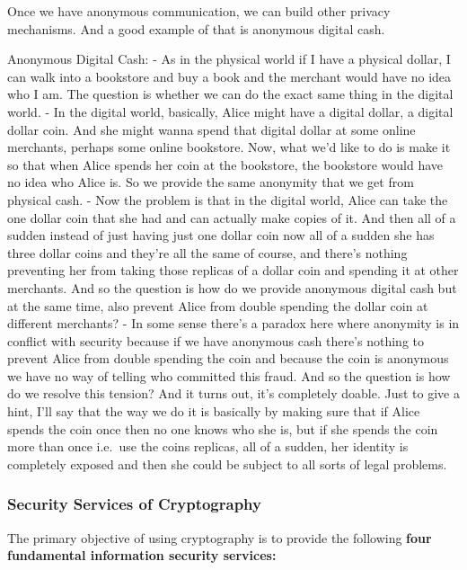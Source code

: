 \documentclass[11pt]{article}
\begin{document}
Once we have anonymous communication, we can build other privacy
mechanisms. And a good example of that is anonymous digital cash.

Anonymous Digital Cash: - As in the physical world if I have a physical
dollar, I can walk into a bookstore and buy a book and the merchant
would have no idea who I am. The question is whether we can do the exact
same thing in the digital world. - In the digital world, basically,
Alice might have a digital dollar, a digital dollar coin. And she might
wanna spend that digital dollar at some online merchants, perhaps some
online bookstore. Now, what we'd like to do is make it so that when
Alice spends her coin at the bookstore, the bookstore would have no idea
who Alice is. So we provide the same anonymity that we get from physical
cash. - Now the problem is that in the digital world, Alice can take the
one dollar coin that she had and can actually make copies of it. And
then all of a sudden instead of just having just one dollar coin now all
of a sudden she has three dollar coins and they're all the same of
course, and there's nothing preventing her from taking those replicas of
a dollar coin and spending it at other merchants. And so the question is
how do we provide anonymous digital cash but at the same time, also
prevent Alice from double spending the dollar coin at different
merchants? - In some sense there's a paradox here where anonymity is in
conflict with security because if we have anonymous cash there's nothing
to prevent Alice from double spending the coin and because the coin is
anonymous we have no way of telling who committed this fraud. And so the
question is how do we resolve this tension? And it turns out, it's
completely doable. Just to give a hint, I'll say that the way we do it
is basically by making sure that if Alice spends the coin once then no
one knows who she is, but if she spends the coin more than once i.e.~use
the coins replicas, all of a sudden, her identity is completely exposed
and then she could be subject to all sorts of legal problems.

\hypertarget{security-services-of-cryptography}{%
\subsubsection{Security Services of
Cryptography}\label{security-services-of-cryptography}}

The primary objective of using cryptography is to provide the following
\textbf{four fundamental information security services:}
\end{document}
